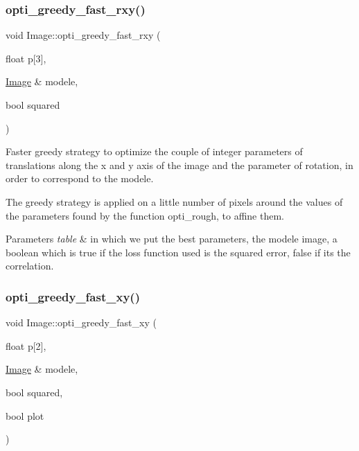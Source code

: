 \mbox{\label{class_image_a90bbd736c4544675793ccec24406c56b}} 
\subsubsection{\texorpdfstring{opti\+\_\+greedy\+\_\+fast\+\_\+rxy()}{opti\_greedy\_fast\_rxy()}}
{\footnotesize\ttfamily void Image\+::opti\+\_\+greedy\+\_\+fast\+\_\+rxy (\begin{DoxyParamCaption}\item[{float}]{p\mbox{[}3\mbox{]},  }\item[{\hyperlink{class_image}{Image} \&}]{modele,  }\item[{bool}]{squared }\end{DoxyParamCaption})}



Faster greedy strategy to optimize the couple of integer parameters of translations along the x and y axis of the image and the parameter of rotation, in order to correspond to the modele. 

The greedy strategy is applied on a little number of pixels around the values of the parameters found by the function opti\+\_\+rough, to affine them.


\begin{DoxyParams}{Parameters}
{\em table} & in which we put the best parameters, the modele image, a boolean which is true if the loss function used is the squared error, false if it\textquotesingle{}s the correlation. \\
\hline
\end{DoxyParams}
\mbox{\label{class_image_afc10861bfe4de599a064fd89b521c1f5}} 
\subsubsection{\texorpdfstring{opti\+\_\+greedy\+\_\+fast\+\_\+xy()}{opti\_greedy\_fast\_xy()}}
{\footnotesize\ttfamily void Image\+::opti\+\_\+greedy\+\_\+fast\+\_\+xy (\begin{DoxyParamCaption}\item[{float}]{p\mbox{[}2\mbox{]},  }\item[{\hyperlink{class_image}{Image} \&}]{modele,  }\item[{bool}]{squared,  }\item[{bool}]{plot }\end{DoxyParamCaption})}



